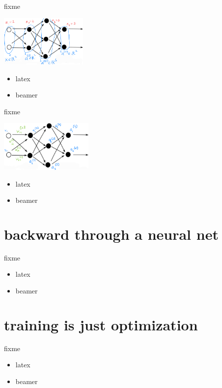 \documentclass[xcolor={svgnames},
               hyperref={colorlinks,citecolor=DeepPink4,linkcolor=FireBrick,urlcolor=Maroon}]
               {beamer}
\begin{document}
\begin{frame}{fixme}

\includegraphics[height=25mm]{figs/state-notation}

\begin{itemize}
\item latex
\item beamer
\end{itemize}
\end{frame}

\begin{frame}{fixme}

\includegraphics[height=25mm]{figs/weight-notation}

\begin{itemize}
\item latex
\item beamer
\end{itemize}
\end{frame}


\section{backward through a neural net}

\begin{frame}{fixme}

\begin{itemize}
\item latex
\item beamer
\end{itemize}
\end{frame}


\section{training is just optimization}

\begin{frame}{fixme}

\begin{itemize}
\item latex
\item beamer
\end{itemize}
\end{frame}
\end{document}
